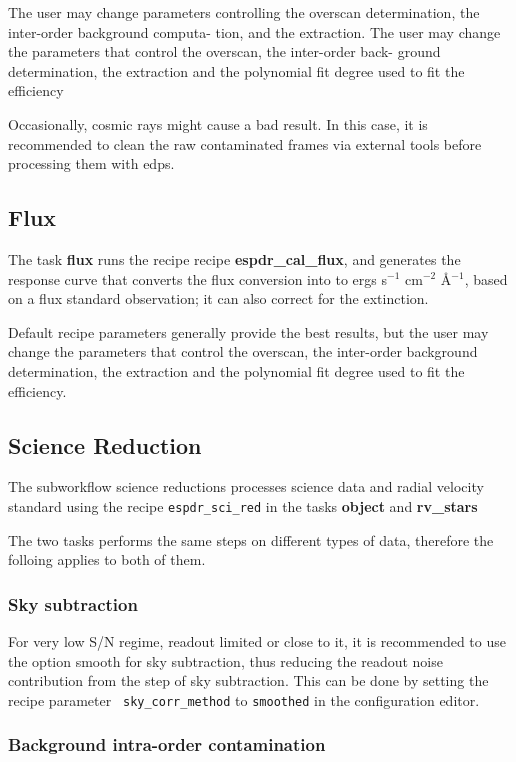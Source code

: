 The user may change parameters controlling the overscan determination, the inter-order background computa-
tion, and the extraction. The user may change the parameters that control the overscan, the inter-order back-
ground determination, the extraction and the polynomial fit degree used to fit the efficiency

Occasionally, cosmic rays might cause a bad result. In this case, it
is recommended to clean the raw contaminated frames via external tools before processing
them with edps.


\subsection{Flux}

The task {\bf flux} runs the recipe recipe {\bf espdr\_cal\_flux}, and
generates the response curve that converts the flux conversion into to
ergs s$^{-1}$ cm$^{-2}$ \AA$^{-1}$, based on a flux standard
observation; it can also correct for the extinction.

Default recipe parameters generally provide the best results, but the
user may change the parameters that control the overscan, the
inter-order background determination, the extraction and the
polynomial fit degree used to fit the efficiency.


\subsection{Science Reduction}
The subworkflow science reductions processes science data and radial velocity standard using the recipe {\tt espdr\_sci\_red} in the tasks {\bf object} and {\bf rv\_stars}

The two tasks performs the same steps on different types of data, therefore the folloing applies to both of them.


\subsubsection{Sky subtraction}

For very low S/N regime, readout limited or close to it, it is
recommended to use the option smooth for sky subtraction, thus
reducing the readout noise contribution from the step of sky
subtraction. This can be done by setting the recipe parameter {\tt
  sky\_corr\_method} to {\tt smoothed} in the configuration editor.


\subsubsection{Background intra-order contamination}

